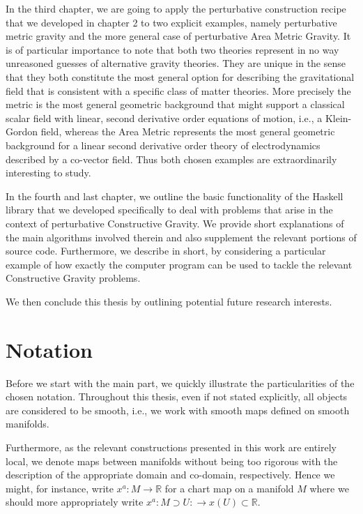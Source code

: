 \documentclass[a4paper,12pt, DIV=14, BCOR=5mm, twoside, headsepline, numbers=noenddot]{scrbook}
\begin{document}
In the third chapter, we are going to apply the perturbative construction recipe that we developed in chapter 2 to two explicit examples, namely perturbative metric gravity and the more general case of perturbative Area Metric Gravity. It is of particular importance to note that both two theories represent in no way unreasoned guesses of alternative gravity theories. They are unique in the sense that they both constitute the most general option for describing the gravitational field that is consistent with a specific class of matter theories. More precisely the metric is the most general geometric background that might support a classical scalar field with linear, second derivative order equations of motion, i.e., a Klein-Gordon field, whereas the Area Metric represents the most general geometric background for a linear second derivative order theory of electrodynamics described by a co-vector field. Thus both chosen examples are extraordinarily interesting to study.

In the fourth and last chapter, we outline the basic functionality of the Haskell library that we developed specifically to deal with problems that arise in the context of perturbative Constructive Gravity. We provide short explanations of the main algorithms involved therein and also supplement the relevant portions of source code. Furthermore, we describe in short, by considering a particular example of how exactly the computer program can be used to tackle the relevant Constructive Gravity problems.

We then conclude this thesis by outlining potential future research interests.

\section*{Notation}

Before we start with the main part, we quickly illustrate the particularities of the chosen notation. Throughout this thesis, even if not stated explicitly, all objects are considered to be smooth, i.e., we work with smooth maps defined on smooth manifolds. 

Furthermore, as the relevant constructions presented in this work are entirely local, we denote maps between manifolds without being too rigorous with the description of the appropriate domain and co-domain, respectively. Hence we might, for instance, write $x^a : M
\rightarrow \mathbb{R}$ for a chart map on a manifold $M$ where we should more appropriately write $x^a : M \supset U : \rightarrow x(U) \subset \mathbb{R} $. 
\end{document}
